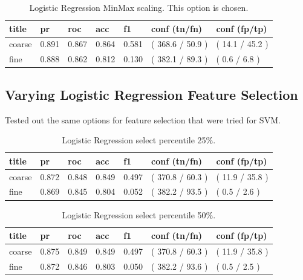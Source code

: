 \documentclass[ms]{nuthesis}
\begin{document}
\FloatBarrier
\begin{table}[H]
\centering
\begin{tabular}{|l||l||l||l||l||l||l|}\toprule
title & pr & roc & acc & f1 & conf (tn/fn) & conf (fp/tp) \\ \midrule
coarse & 0.891 & 0.867 & 0.864 & 0.581 & ( 368.6 / 50.9 ) & ( 14.1 / 45.2 ) \\
fine & 0.888 & 0.862 & 0.812 & 0.130 & ( 382.1 / 89.3 ) & ( 0.6 / 6.8 ) \\ \bottomrule
\end{tabular}
\caption{Logistic Regression MinMax scaling. This option is chosen.}
\label{tab:LogRegMinMax}
\end{table}
\FloatBarrier


\subsection{Varying Logistic Regression Feature Selection}
\par Tested out the same options for feature selection that were tried for SVM.

\FloatBarrier
\begin{table}[H]
\centering
\begin{tabular}{|l||l||l||l||l||l||l|}\toprule
title & pr & roc & acc & f1 & conf (tn/fn) & conf (fp/tp) \\ \midrule
coarse & 0.872 & 0.848 & 0.849 & 0.497 & ( 370.8 / 60.3 ) & ( 11.9 / 35.8 ) \\
fine & 0.869 & 0.845 & 0.804 & 0.052 & ( 382.2 / 93.5 ) & ( 0.5 / 2.6 ) \\ \bottomrule
\end{tabular}
\caption{Logistic Regression select percentile 25\%.}
\label{tab:LogRegSel25}
\end{table}
\FloatBarrier


\FloatBarrier
\begin{table}[H]
\centering
\begin{tabular}{|l||l||l||l||l||l||l|}\toprule
title & pr & roc & acc & f1 & conf (tn/fn) & conf (fp/tp) \\ \midrule
coarse & 0.875 & 0.849 & 0.849 & 0.497 & ( 370.8 / 60.3 ) & ( 11.9 / 35.8 ) \\
fine & 0.872 & 0.846 & 0.803 & 0.050 & ( 382.2 / 93.6 ) & ( 0.5 / 2.5 ) \\ \bottomrule
\end{tabular}
\caption{Logistic Regression select percentile 50\%.}
\label{tab:LogRegSel50}
\end{table}
\FloatBarrier
\end{document}
